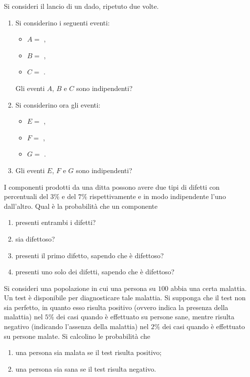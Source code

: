 Si consideri il lancio di un dado, ripetuto due volte.
\begin{enumerate}
	\item Si considerino i seguenti eventi:
	\begin{itemize}
		\item $A=$ ,
		\item $B=$ ,
		\item $C=$ .
	\end{itemize}
	Gli eventi $A$, $B$ e $C$ sono indipendenti?
	\item Si considerino ora gli eventi:
	\begin{itemize}
		\item $E=$ ,
		\item $F=$ ,
		\item $G=$ .
	\end{itemize}
	\item Gli eventi $E$, $F$ e $G$ sono indipendenti?
\end{enumerate}

\Esercizio{}

I componenti prodotti da una ditta possono avere due tipi di difetti con percentuali del $3\%$ e del $7\%$ rispettivamente e in modo indipendente l'uno dall'altro. Qual è la probabilità che un componente
\begin{enumerate}
	\item presenti entrambi i difetti?
	\item sia difettoso?
	\item presenti il primo difetto, sapendo che è difettoso?
	\item presenti uno solo dei difetti, sapendo che è difettoso?
\end{enumerate}

\Esercizio{}

Si consideri una popolazione in cui una persona su $100$ abbia una certa malattia. Un test è disponibile per diagnosticare tale malattia. Si supponga che il test non sia perfetto, in quanto esso risulta positivo (ovvero indica la presenza della malattia) nel $5\%$ dei casi quando è effettuato su persone sane, mentre risulta negativo (indicando l'assenza della malattia) nel $2\%$ dei casi quando è effettuato su persone malate. Si calcolino le probabilità che
\begin{enumerate}
	\item una persona sia malata se il test risulta positivo;
	\item una persona sia sana se il test risulta negativo.
\end{enumerate}


